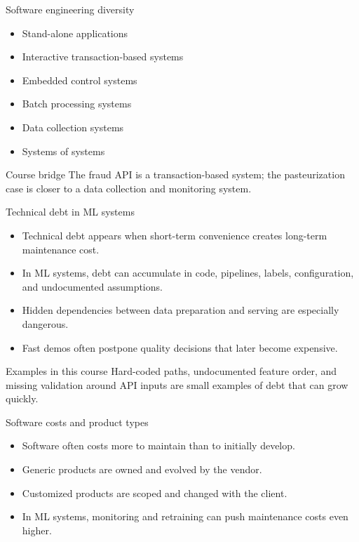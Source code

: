 \begin{frame}{Software engineering diversity}
\begin{itemize}
\item Stand-alone applications
\item Interactive transaction-based systems
\item Embedded control systems
\item Batch processing systems
\item Data collection systems
\item Systems of systems
\end{itemize}
\begin{block}{Course bridge}
The fraud API is a transaction-based system; the pasteurization case is closer to a data collection and monitoring system.
\end{block}
\coursefooter
\end{frame}

\begin{frame}{Technical debt in ML systems}
\begin{itemize}
\item Technical debt appears when short-term convenience creates long-term maintenance cost.
\item In ML systems, debt can accumulate in code, pipelines, labels, configuration, and undocumented assumptions.
\item Hidden dependencies between data preparation and serving are especially dangerous.
\item Fast demos often postpone quality decisions that later become expensive.
\end{itemize}
\begin{block}{Examples in this course}
Hard-coded paths, undocumented feature order, and missing validation around API inputs are small examples of debt that can grow quickly.
\end{block}
\coursefooter
\end{frame}

\begin{frame}{Software costs and product types}
\begin{itemize}
\item Software often costs more to maintain than to initially develop.
\item Generic products are owned and evolved by the vendor.
\item Customized products are scoped and changed with the client.
\item In ML systems, monitoring and retraining can push maintenance costs even higher.
\end{itemize}
\coursefooter
\end{frame}

